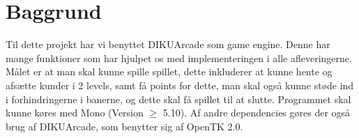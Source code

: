 \section{Baggrund}
Til dette projekt har vi benyttet DIKUArcade som game engine. Denne har mange funktioner som har hjulpet os med implementeringen i alle afleveringerne. Målet er at man skal kunne spille spillet, dette inkluderer at kunne hente og afsætte kunder i 2 levels, samt få points for dette, man skal også kunne støde ind i forhindringerne i banerne, og dette skal få spillet til at slutte. Programmet skal kunne køres med Mono (Version $\geq$ 5.10). Af andre dependencies gøres der også brug af DIKUArcade, som benytter sig af OpenTK 2.0.

